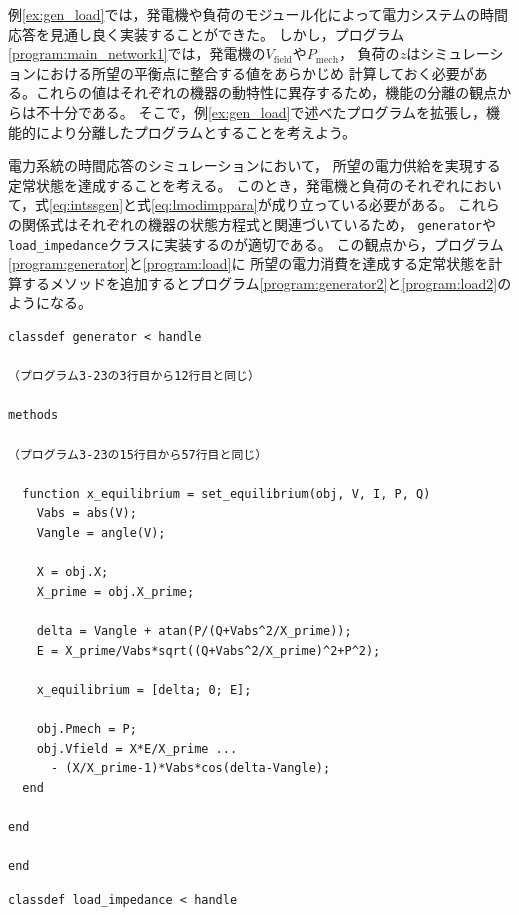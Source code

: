 \documentclass[tombow,dvipdfmx]{corona-a5-1.1}
\begin{document}
例\ref{ex:gen_load}では，発電機や負荷のモジュール化によって電力システムの時間応答を見通し良く実装することができた。
しかし，プログラム\nobreak\ref{program:main_network1}では，発電機の$V_\mathrm{field}$や$P_\mathrm{mech}$，
負荷の$z$はシミュレーションにおける所望の平衡点に整合する値をあらかじめ
計算しておく必要がある。これらの値はそれぞれの機器の動特性に異存するため，機能の分離の観点からは不十分である。
そこで，例\ref{ex:gen_load}で述べたプログラムを拡張し，機能的により分離したプログラムとすることを考えよう。
\begin{例}
電力系統の時間応答のシミュレーションにおいて，
所望の電力供給を実現する定常状態を達成することを考える。
このとき，発電機と負荷のそれぞれにおいて，式\ref{eq:intssgen}と式\ref{eq:lmodimppara}が成り立っている必要がある。
これらの関係式はそれぞれの機器の状態方程式と関連づいているため，
\verb|generator|や\verb|load_impedance|クラスに実装するのが適切である。
この観点から，プログラム\ref{program:generator}と\ref{program:load}に
所望の電力消費を達成する定常状態を計算するメソッドを追加するとプログラム\nobreak\ref{program:generator2}と\ref{program:load2}のようになる。

\begin{PROGRAMA}[count,title={generator.m}]\label{program:generator2}
  \begin{verbatim}
classdef generator < handle
  
（プログラム3-23の3行目から12行目と同じ）

methods

（プログラム3-23の15行目から57行目と同じ）

  function x_equilibrium = set_equilibrium(obj, V, I, P, Q)
    Vabs = abs(V);
    Vangle = angle(V);
    
    X = obj.X;
    X_prime = obj.X_prime;
    
    delta = Vangle + atan(P/(Q+Vabs^2/X_prime));
    E = X_prime/Vabs*sqrt((Q+Vabs^2/X_prime)^2+P^2);
    
    x_equilibrium = [delta; 0; E];
    
    obj.Pmech = P;
    obj.Vfield = X*E/X_prime ...
      - (X/X_prime-1)*Vabs*cos(delta-Vangle);
  end

end
  
end
\end{verbatim}
\end{PROGRAMA}

\begin{PROGRAMA}[count,title={load\_impedance.m}]\label{program:load2}
\begin{verbatim}
classdef load_impedance < handle
  

\end{verbatim}
\end{PROGRAMA}
\end{例}
\end{document}
